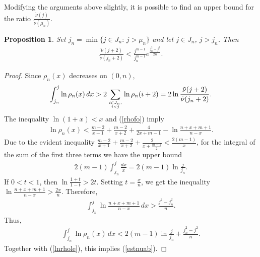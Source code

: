 \documentclass[10pt]{amsart}
\newtheorem{proposition}{Proposition}
\theoremstyle{remark}
\let\td=\tilde
\begin{document}
Modifying the arguments above slightly, it is possible to find an
upper bound for the ratio $\frac{\td\nu(j)}{\td\nu(\mu_n)}$.
\begin{proposition}\label{nuabove}
Set $j_n=\min\{j\in J_n:\,j>\mu_n\}$ and let $j\in J_n$, $j>j_n$.
Then
\begin{eqnarray}\label{estnuab}
\frac{\td\nu(j+2)}{\td\nu(j_n+2)}
<\frac{j^{m-1}}{j_n^{m-1}}e^{\frac{j_n^2-j^2}{2n}}.
\end{eqnarray}
\end{proposition}
\begin{proof}
Since $\rho_n(x)$ decreases on $(0,n)$,
\begin{eqnarray}\label{lnrhole}
\int_{j_n}^{j}\ln\rho_n(x)\,dx>2\sum_{i\in J_n,\atop i<
j}\ln\rho_n(i+2)= 2\ln\frac{\td\nu(j+2)}{\td\nu(j_n+2)}.
\end{eqnarray}
The inequality $\ln(1+x)<x$ and (\ref{rhofo}) imply
\begin{eqnarray*}
\ln\rho_n(x)<\frac{m-2}{x+1}+\frac{m-2}{x+2}+\frac{4}{2x+m-1}
-\ln\frac{n+x+m+1}{n-x}.
\end{eqnarray*}
Due to the evident inequality
$\frac{m-2}{x+1}+\frac{m-2}{x+2}+\frac{2}{x+\frac{m-1}{2}}
<\frac{2(m-1)}{x}$, for the integral of the sum of the first three
terms we have the upper bound
\begin{eqnarray*}
2(m-1)\int_{j_n}^{j}\frac{dx}{x} =2(m-1)\ln\frac{j}{j_n}.
\end{eqnarray*}
If $0<t<1$, then $\ln\frac{1+t}{1-t}>2t$. Setting $t=\frac{x}{n}$,
we get the inequality $\ln\frac{n+x+m+1}{n-x}>\frac{2x}{n}$.
Therefore,
\begin{eqnarray}\label{estrtau}
\int_{j_n}^j\ln\frac{n+x+m+1}{n-x}\,dx>\frac{j^2-j_n^2}{n}.
\end{eqnarray}
Thus,
\begin{eqnarray*}
\int_{j_n}^j\ln\rho_n(x)\,dx<2(m-1)\ln\frac{j}{j_n}+\frac{j_n^2-j^2}{n}.
\end{eqnarray*}
Together with (\ref{lnrhole}), this implies (\ref{estnuab}).
\end{proof}
\end{document}
